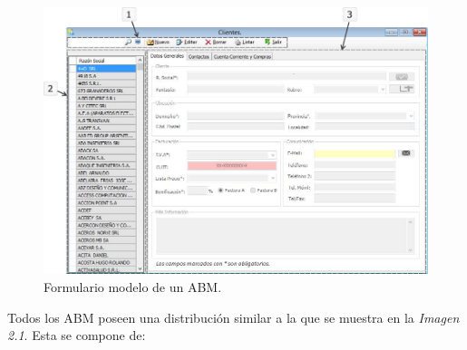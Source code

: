 \documentclass{book}
\begin{document}
\begin{figure}[H]
	\centering
	\includegraphics[width=1.0\textwidth]{images/ventanas/ventana-03.jpg}
	\caption{Formulario modelo de un ABM.}
	\medskip
\end{figure}
\bigskip\bigskip
\newpage


Todos los ABM poseen una distribución similar a la que se muestra en la \textit{Imagen 2.1}. Esta se compone de:
\bigskip
\end{document}
